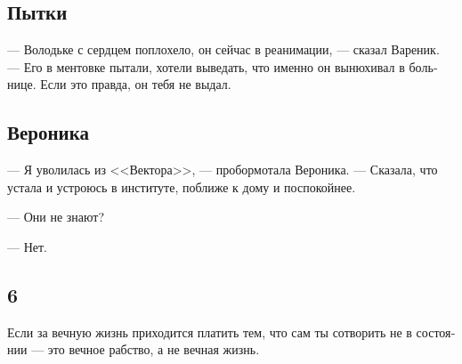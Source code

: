 \documentclass[a5paper,12pt,fleqn]{extbook}\usepackage{cooltooltips}\usepackage{polyglossia}\setdefaultlanguage[babelshorthands=true]{russian}\setotherlanguage{english}\defaultfontfeatures{Ligatures=TeX,Mapping=tex-text} \usepackage{xcolor}\definecolor{lightgray}{HTML}{bbbbbb}\color{lightgray}\newcommand{\ml}[3]{\textenglish{\textcolor{black}{#3}}}
\begin{document}
\subsection{Пытки}

--- Володьке с сердцем поплохело, он сейчас в реанимации, --- сказал Вареник.
--- Его в ментовке пытали, хотели выведать, что именно он вынюхивал в больнице.
Если это правда, он тебя не выдал.

\subsection{Вероника}

--- Я уволилась из <<Вектора>>, --- пробормотала Вероника.
--- Сказала, что устала и устроюсь в институте, поближе к дому и поспокойнее.

--- Они не знают?

--- Нет.

\subsection{6}

Если за вечную жизнь приходится платить тем, что сам ты сотворить не в состоянии --- это вечное рабство, а не вечная жизнь.


\tableofcontents

~

\newpage
\thispagestyle{plain}

~


\end{document}
